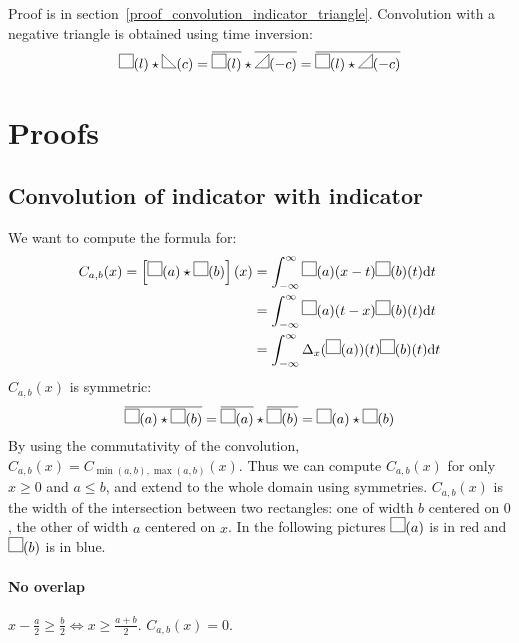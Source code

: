 \documentclass[a4paper,10pt]{article}
\newcommand\Shifted[2]{\Delta_{#1}(#2)}
\newcommand\Reversed[1]{\overline{#1}}
\newcommand\SymSquare{\begin{tikzpicture}%
        \draw (0,0) -- (0,1em) -- (1em,1em) -- (1em,0) -- cycle;
\end{tikzpicture}}
\newcommand\Indicator[1]{\SymSquare(#1)}
\newcommand\SymPositiveTriangle{\begin{tikzpicture}%
        \draw (0,0) -- (1em,0em) -- (1em,1em) -- cycle;
\end{tikzpicture}}
\newcommand\PositiveTriangle[1]{\SymPositiveTriangle(#1)}
\newcommand\SymNegativeTriangle{\begin{tikzpicture}%
        \draw (0,0) -- (0,1em) -- (1em,0em) -- cycle;
\end{tikzpicture}}
\newcommand\NegativeTriangle[1]{\SymNegativeTriangle(#1)}
\newcommand\D{\mathrm{d}}
\newcommand\Convolution{\star}
\newcommand\ConvolutionInt[2]{\int_{-\infty}^{\infty}#1 \D#2}
\newcommand\Equiv{\Leftrightarrow}
\begin{document}
Proof is in section~\ref{proof_convolution_indicator_triangle}.
Convolution with a negative triangle is obtained using time inversion:
\[
    \Indicator{l} \Convolution \NegativeTriangle{c} =
    \Reversed{\Indicator{l}} \Convolution \Reversed{\PositiveTriangle{-c}} =
    \Reversed{\Indicator{l} \Convolution \PositiveTriangle{-c}}
\]

\section{Proofs}

\subsection{Convolution of indicator with indicator}\label{proof_convolution_indicator_indicator}

We want to compute the formula for:
\[ \begin{split}
    C_{a,b}(x) = \left[ \Indicator{a} \Convolution \Indicator{b} \right] (x) & = \ConvolutionInt{\Indicator{a}(x-t) \Indicator{b}(t)}{t} \\
    & = \ConvolutionInt{\Indicator{a}(t-x) \Indicator{b}(t)}{t} \\
    & = \ConvolutionInt{\Shifted{x}{\Indicator{a}}(t) \Indicator{b}(t)}{t}
\end{split} \]
$C_{a,b}(x)$ is symmetric:
\[
    \Reversed{\Indicator{a} \Convolution \Indicator{b}} =
    \Reversed{\Indicator{a}} \Convolution \Reversed{\Indicator{b}} =
    \Indicator{a} \Convolution \Indicator{b}
\]
By using the commutativity of the convolution, $C_{a,b}(x) = C_{\min(a,b),\max(a,b)}(x)$.
Thus we can compute $C_{a,b}(x)$ for only $x \ge 0$ and $a \le b$, and extend to the whole domain using symmetries.
$C_{a,b}(x)$ is the width of the intersection between two rectangles: one of width $b$ centered on $0$, the other of width $a$ centered on $x$.
In the following pictures $\Indicator{a}$ is in red and $\Indicator{b}$ is in blue.

\paragraph{No overlap}
$x - \frac{a}{2} \ge \frac{b}{2} \Equiv x \ge \frac{a+b}{2}$.
$C_{a,b}(x) = 0$.
\end{document}
